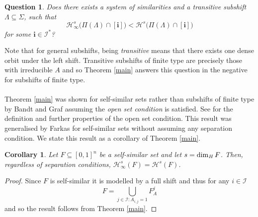 \documentclass[11pt,english,british]{article}
\numberwithin{equation}{section}
\newtheorem{cor}[thm]{Corollary}
\newtheorem{ques}[thm]{Question}
\begin{document}
\begin{ques}
	Does there exists a system of similarities and a transitive subshift $\Lambda \subseteq \Sigma$, such that
	\[
	\mathcal{H}_\infty^s \big(\Pi(\Lambda) \cap [\textbf{i}]\big) <  \mathcal{H}^s \big(\Pi(\Lambda) \cap [\textbf{i}]\big)
	\]
	for some $\textbf{i} \in \mathcal{I}^*$?
\end{ques}
Note that for general subshifts, being \emph{transitive} means that there exists one dense orbit under the left shift.  Transitive subshifts of finite type are precisely those with irreducible $A$ and so Theorem \ref{main} answers this question in the negative for subshifts of finite type.
\\ \\
Theorem \ref{main} was shown for self-similar sets rather than subshifts of finite type by Bandt and Graf \cite[Proposition 3]{bandt-graf} assuming the \emph{open set condition} is satisfied.  See \cite[Section 9.2]{falconer} for the definition and further properties of the open set condition.  This result was generalised by Farkas \cite[Proposition 1.11]{farkas} for self-similar sets without assuming any separation condition. We state this result as a corollary of Theorem \ref{main}.

\begin{cor} \label{corselfsim}
Let $F \subseteq [0,1]^n$ be a self-similar set and let $s = \dim_\text{\emph{H}} F$.  Then, regardless of separation conditions, $\mathcal{H}_\infty^s (F) =  \mathcal{H}^s (F)$.
\end{cor}

\begin{proof}
Since $F$ is self-similar it is modelled by a full shift and thus for any $i \in \mathcal{I}$
\[
F = \bigcup_{j \in \mathcal{I} : A_{i,j} = 1}  F_A^j 
\]
and so the result follows from Theorem \ref{main}.
\end{proof}
\end{document}
